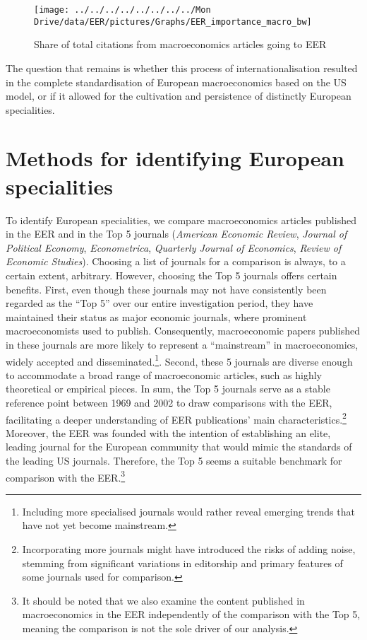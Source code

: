 \documentclass[
  12pt,
  onecolumn]{article}
\begin{document}
\begin{figure}[h]

{\centering \texttt{[image: ../../../../../../../../Mon Drive/data/EER/pictures/Graphs/EER\_importance\_macro\_bw]} 

}

\caption{Share of total citations from macroeconomics articles going to EER}\label{fig:plot-eer-importance-macro}
\end{figure}

The question that remains is whether this process of
internationalisation resulted in the complete standardisation of
European macroeconomics based on the US model, or if it allowed for the
cultivation and persistence of distinctly European specialities.

\hypertarget{methods}{%
\section{Methods for identifying European specialities}\label{methods}}

To identify European specialities, we compare macroeconomics articles
published in the EER and in the Top 5 journals (\emph{American Economic
Review}, \emph{Journal of Political Economy}, \emph{Econometrica},
\emph{Quarterly Journal of Economics}, \emph{Review of Economic
Studies}). Choosing a list of journals for a comparison is always, to a
certain extent, arbitrary. However, choosing the Top 5 journals offers
certain benefits. First, even though these journals may not have
consistently been regarded as the ``Top 5'' over our entire
investigation period, they have maintained their status as major
economic journals, where prominent macroeconomists used to publish.
Consequently, macroeconomic papers published in these journals are more
likely to represent a ``mainstream'' in macroeconomics, widely accepted
and disseminated.\footnote{Including more specialised journals would
  rather reveal emerging trends that have not yet become mainstream.}.
Second, these 5 journals are diverse enough to accommodate a broad range
of macroeconomic articles, such as highly theoretical or empirical
pieces. In sum, the Top 5 journals serve as a stable reference point
between 1969 and 2002 to draw comparisons with the EER, facilitating a
deeper understanding of EER publications' main
characteristics.\footnote{Incorporating more journals might have
  introduced the risks of adding noise, stemming from significant
  variations in editorship and primary features of some journals used
  for comparison.} Moreover, the EER was founded with the intention of
establishing an elite, leading journal for the European community that
would mimic the standards of the leading US journals. Therefore, the Top
5 seems a suitable benchmark for comparison with the EER.\footnote{It
  should be noted that we also examine the content published in
  macroeconomics in the EER independently of the comparison with the Top
  5, meaning the comparison is not the sole driver of our analysis.}
\end{document}
